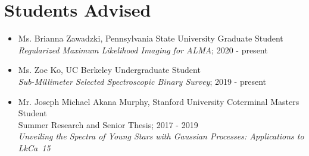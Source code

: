 \section*{Students Advised}
\begin{itemize}
  \item Ms. Brianna Zawadzki, Pennsylvania State University Graduate Student \\
  \emph{Regularized Maximum Likelihood Imaging for ALMA}; 2020 - present\\
  \item Ms. Zoe Ko, UC Berkeley Undergraduate Student \\ 
  \emph{Sub-Millimeter Selected Spectroscopic Binary Survey}; 2019 - present \\
  \item Mr. Joseph Michael Akana Murphy, Stanford University Coterminal Masters Student \\
  Summer Research and Senior Thesis; 2017 - 2019\\
  \emph{Unveiling the Spectra of Young Stars with Gaussian Processes: Applications to LkCa~15}
\end{itemize}
